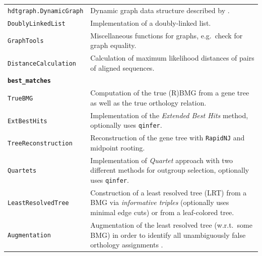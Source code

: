 \documentclass[hidelinks,11pt]{article}
\begin{document}
{\begin{longtable}{| p{4.0cm} | p{10cm} |}
	\texttt{hdtgraph.DynamicGraph} &
	Dynamic graph data structure described by \citet{holm2001}. \\
	\texttt{DoublyLinkedList} &
	Implementation of a doubly-linked list. \\
	\texttt{GraphTools} &
	Miscellaneous functions for graphs, e.g.\ check for graph equality. \\
	\texttt{DistanceCalculation} &
	Calculation of maximum likelihood distances of pairs of aligned sequences. \\
	\hline
	\multicolumn{2}{|l|}{\textbf{\texttt{best\_matches}}}\\
	\hline
	\texttt{TrueBMG} &
	Computation of the true (R)BMG from a gene tree as well as the true orthology relation. \\
	\texttt{ExtBestHits} &
	Implementation of the \emph{Extended Best Hits} method, optionally uses \texttt{qinfer}. \\
	\texttt{TreeReconstruction} &
	Reconstruction of the gene tree with \texttt{RapidNJ} \citep{simonsen2008} and midpoint rooting. \\
	\texttt{Quartets} &
	Implementation of \emph{Quartet} approach with two different methods for outgroup selection, optionally uses \texttt{qinfer}. \\
	\texttt{LeastResolvedTree} &
	Construction of a least resolved tree (LRT) from a BMG via \emph{informative triples} (optionally uses minimal edge cuts) or from a leaf-colored tree. \\
	\texttt{Augmentation} &
	Augmentation of the least resolved tree (w.r.t.\ some BMG) in order to identify all unambiguously false orthology assignments \citep{schaller2020}. \\

\end{longtable}}
\end{document}
